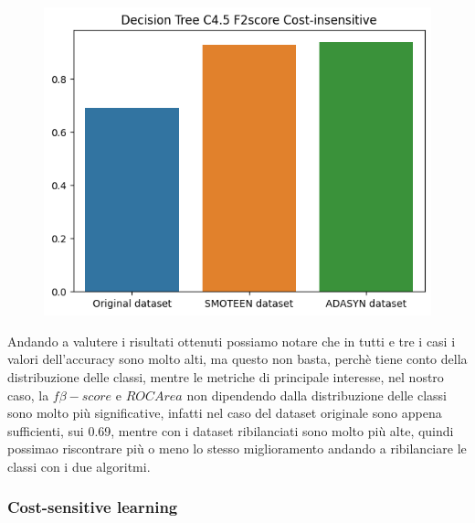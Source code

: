 \documentclass[italian,12pt,a4paper]{article}
\begin{document}
\begin{center}
		\begin{figure}[h]
			\centering
			\includegraphics[scale=0.73]{DecTree}
		\end{figure}
	
	
	\end{center}
	
	Andando a valutere i risultati ottenuti possiamo notare che in tutti e tre i casi i valori dell'accuracy sono molto alti, ma questo non basta, perchè tiene conto della distribuzione delle classi, mentre le metriche di principale interesse, nel nostro caso, la $f\beta-score$ e $ROC Area$ non dipendendo dalla distribuzione delle classi sono molto più significative, infatti nel caso del dataset originale sono appena sufficienti, sui 0.69, mentre con i dataset ribilanciati sono molto più alte, quindi possimao riscontrare più o meno lo stesso miglioramento andando a ribilanciare le classi con i due algoritmi. \\
	\linebreak
	\linebreak
	
	\subsubsection{Cost-sensitive learning}
	
\end{document}
